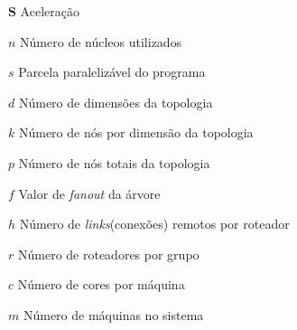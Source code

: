 \documentclass[
	12pt,				%
	openright,			%
	twoside,			%
	a4paper,			%
	english,			%
	brazil,				%
	]{abntex2}
\newcommand{\links}{\textit{links}\xspace}
\begin{document}
\begin{simbolos}
    \item[$\textbf{S}$] Aceleração
    \item[$n$] Número de núcleos utilizados
    \item[$s$] Parcela paralelizável do programa
    \item[$d$] Número de dimensões da topologia
    \item[$k$] Número de nós por dimensão da topologia
    \item[$p$] Número de nós totais da topologia
    \item[$f$] Valor de \textit{fanout} da árvore
    \item[$h$] Número de \links (conexões) remotos por roteador
    \item[$r$] Número de roteadores por grupo
    \item[$c$] Número de cores por máquina
    \item[$m$] Número de máquinas no sistema
\end{simbolos}

\tableofcontents*
\cleardoublepage



\textual





\end{document}
